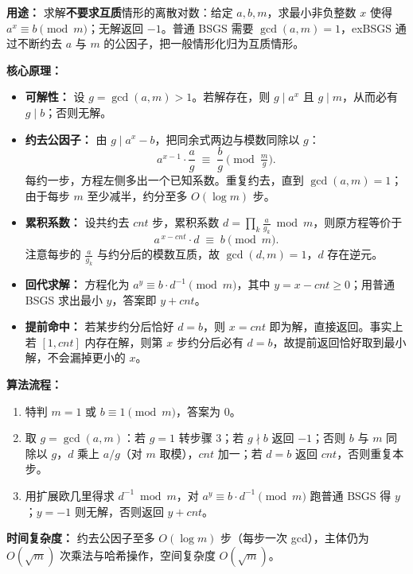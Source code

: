 \textbf{用途：}
求解\textbf{不要求互质}情形的离散对数：给定 $a, b, m$，求最小非负整数 $x$ 使得 $a^{x} \equiv b \pmod{m}$；无解返回 $-1$。普通 BSGS 需要 $\gcd(a, m) = 1$，exBSGS 通过不断约去 $a$ 与 $m$ 的公因子，把一般情形化归为互质情形。

\textbf{核心原理：}

\begin{itemize}
  \item \textbf{可解性：} 设 $g = \gcd(a, m) > 1$。若解存在，则 $g \mid a^{x}$ 且 $g \mid m$，从而必有 $g \mid b$；否则无解。
  \item \textbf{约去公因子：} 由 $g \mid a^{x} - b$，把同余式两边与模数同除以 $g$：
  \[ a^{x-1} \cdot \frac{a}{g} \;\equiv\; \frac{b}{g} \pmod{\tfrac{m}{g}}. \]
  每约一步，方程左侧多出一个已知系数。重复约去，直到 $\gcd(a, m) = 1$；由于每步 $m$ 至少减半，约分至多 $O(\log m)$ 步。
  \item \textbf{累积系数：} 设共约去 $cnt$ 步，累积系数 $d = \prod_k \frac{a}{g_k} \bmod m$，则原方程等价于
  \[ a^{\,x - cnt} \cdot d \;\equiv\; b \pmod{m}. \]
  注意每步的 $\frac{a}{g_k}$ 与约分后的模数互质，故 $\gcd(d, m) = 1$，$d$ 存在逆元。
  \item \textbf{回代求解：} 方程化为 $a^{y} \equiv b \cdot d^{-1} \pmod{m}$，其中 $y = x - cnt \ge 0$；用普通 BSGS 求出最小 $y$，答案即 $y + cnt$。
  \item \textbf{提前命中：} 若某步约分后恰好 $d = b$，则 $x = cnt$ 即为解，直接返回。事实上若 $[1, cnt]$ 内存在解，则第 $x$ 步约分后必有 $d = b$，故提前返回恰好取到最小解，不会漏掉更小的 $x$。
\end{itemize}

\textbf{算法流程：}

\begin{enumerate}
  \item 特判 $m = 1$ 或 $b \equiv 1 \pmod m$，答案为 $0$。
  \item 取 $g = \gcd(a, m)$：若 $g = 1$ 转步骤 3；若 $g \nmid b$ 返回 $-1$；否则 $b$ 与 $m$ 同除以 $g$，$d$ 乘上 $a/g$（对 $m$ 取模），$cnt$ 加一；若 $d = b$ 返回 $cnt$，否则重复本步。
  \item 用扩展欧几里得求 $d^{-1} \bmod m$，对 $a^{y} \equiv b \cdot d^{-1} \pmod{m}$ 跑普通 BSGS 得 $y$；$y = -1$ 则无解，否则返回 $y + cnt$。
\end{enumerate}

\textbf{时间复杂度：} 约去公因子至多 $O(\log m)$ 步（每步一次 gcd），主体仍为 $O(\sqrt{m})$ 次乘法与哈希操作，空间复杂度 $O(\sqrt{m})$。



